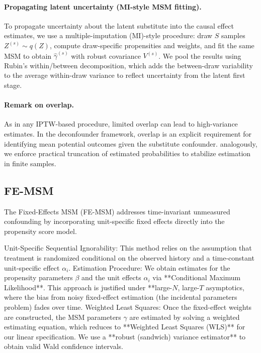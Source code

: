 \paragraph{Propagating latent uncertainty (MI-style MSM fitting).}
To propagate uncertainty about the latent substitute into the causal effect estimates, we use a multiple-imputation (MI)-style procedure: draw $S$ samples $Z^{(s)}\sim q(Z)$, compute draw-specific propensities and weights, and fit the same MSM to obtain $\widehat{\gamma}^{(s)}$ with robust covariance $V^{(s)}$. We pool the results using Rubin's within/between decomposition, which adds the between-draw variability to the average within-draw variance to reflect uncertainty from the latent first stage.

\paragraph{Remark on overlap.}
As in any IPTW-based procedure, limited overlap can lead to high-variance estimates. 
In the deconfounder framework, overlap is an explicit requirement for identifying mean 
potential outcomes given the substitute confounder. 
analogously, we enforce practical truncation of estimated probabilities to 
stabilize estimation in finite samples.

\subsection{FE-MSM}
The Fixed-Effects MSM (FE-MSM) addresses time-invariant unmeasured confounding by incorporating unit-specific fixed effects directly into the propensity score model.

Unit-Specific Sequential Ignorability: This method relies on the assumption that treatment is randomized conditional on the observed history and a time-constant unit-specific effect $\alpha_i$.
Estimation Procedure: We obtain estimates for the propensity parameters $\beta$ and the unit effects $\alpha_i$ via **Conditional Maximum Likelihood**. This approach is justified under **large-$N$, large-$T$ asymptotics, where the bias from noisy fixed-effect estimation (the incidental parameters problem) fades over time.
Weighted Least Squares: Once the fixed-effect weights are constructed, the MSM parameters $\gamma$ are estimated by solving a weighted estimating equation, which reduces to **Weighted Least Squares (WLS)** for our linear specification. We use a **robust (sandwich) variance estimator** to obtain valid Wald confidence intervals.

